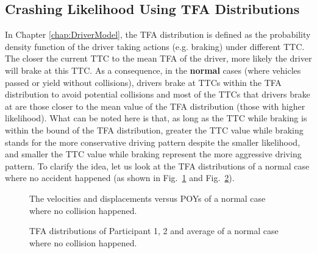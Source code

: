 \subsection{Crashing Likelihood Using TFA Distributions}
In Chapter \ref{chap:DriverModel}, the TFA distribution is defined as the probability density function of the driver taking actions (e.g. braking) under different TTC. The closer the current TTC to the mean TFA of the driver, more likely the driver will brake at this TTC. As a consequence, in the \textbf{normal} cases (where vehicles passed or yield without collisions), drivers brake at TTCs within the TFA distribution to avoid potential collisions and most of the TTCs that drivers brake at are those closer to the mean value of the TFA distribution (those with higher likelihood). What can be noted here is that, as long as the TTC while braking is within the bound of the TFA distribution, greater the TTC value while braking stands for the more conservative driving pattern despite the smaller likelihood, and smaller the TTC value while braking represent the more aggressive driving pattern. To clarify the idea, let us look at the TFA distributions of a normal case where no accident happened (as shown in Fig.~\ref{fig:normal015} and Fig.~\ref{fig:TFAs_normal015}).

\begin{figure}[htbp!]
\begin{center}
\end{center}
\caption{The velocities and displacements versus POYs of a normal case where no collision happened.}
\label{fig:normal015} 
\end{figure}

\begin{figure}[htbp!]
\begin{center}
\end{center}
\caption{TFA distributions of Participant 1, 2 and average of a normal case where no collision happened.}
\label{fig:TFAs_normal015} 
\end{figure}

